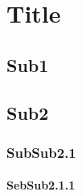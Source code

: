 

\chapter{Title}

\label{Label for title 4}

\section{Sub1}
\section{Sub2}
\subsection{SubSub2.1}
\subsubsection{SebSub2.1.1}